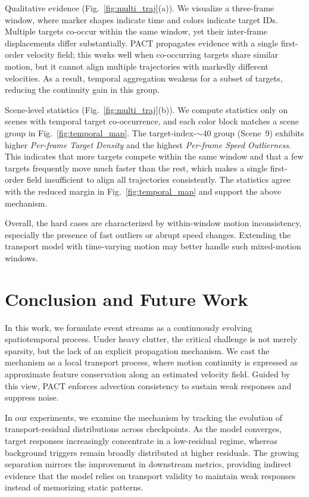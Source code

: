 \documentclass[runningheads]{llncs}
\begin{document}
Qualitative evidence (Fig.~\ref{fig:multi_traj}(a)).
We visualize a three-frame window, where marker shapes indicate time and colors indicate target IDs.
Multiple targets co-occur within the same window, yet their inter-frame displacements differ substantially.
PACT propagates evidence with a single first-order velocity field; this works well when co-occurring targets share similar motion, but it cannot align multiple trajectories with markedly different velocities.
As a result, temporal aggregation weakens for a subset of targets, reducing the continuity gain in this group.

Scene-level statistics (Fig.~\ref{fig:multi_traj}(b)).
We compute statistics only on scenes with temporal target co-occurrence, and each color block matches a scene group in Fig.~\ref{fig:temporal_map}.
The target-index-$\sim$40 group (Scene~9) exhibits higher \emph{Per-frame Target Density} and the highest \emph{Per-frame Speed Outlierness}.
This indicates that more targets compete within the same window and that a few targets frequently move much faster than the rest, which makes a single first-order field insufficient to align all trajectories consistently.
The statistics agree with the reduced margin in Fig.~\ref{fig:temporal_map} and support the above mechanism.

Overall, the hard cases are characterized by within-window motion inconsistency, especially the presence of fast outliers or abrupt speed changes.
Extending the transport model with time-varying motion may better handle such mixed-motion windows.

\section{Conclusion and Future Work}
In this work, we formulate event streams as a continuously evolving spatiotemporal process. 
Under heavy clutter, the critical challenge is not merely sparsity, but the lack of an explicit propagation mechanism.
We cast the mechanism as a local transport process, where motion continuity is expressed as approximate feature conservation along an estimated velocity field. 
Guided by this view, PACT enforces advection consistency to sustain weak responses and suppress noise.

In our experiments, we examine the mechanism by tracking the evolution of transport-residual distributions across checkpoints. 
As the model converges, target responses increasingly concentrate in a low-residual regime, whereas background triggers remain broadly distributed at higher residuals. 
The growing separation mirrors the improvement in downstream metrics, providing indirect evidence that the model relies on transport validity to maintain weak responses instead of memorizing static patterns.
\end{document}
